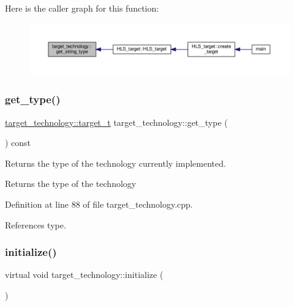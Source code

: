 Here is the caller graph for this function\+:
\nopagebreak
\begin{figure}[H]
\begin{center}
\leavevmode
\includegraphics[width=350pt]{d8/d05/classtarget__technology_a53355954503841a8ead7a8dc9889af85_icgraph}
\end{center}
\end{figure}
\mbox{\label{classtarget__technology_a4edc5ba729f24a445c0f5edb37d5f44b}} 
\subsubsection{\texorpdfstring{get\+\_\+type()}{get\_type()}}
{\footnotesize\ttfamily \hyperlink{classtarget__technology_a84257c2d384aa7dce6a060105113459b}{target\+\_\+technology\+::target\+\_\+t} target\+\_\+technology\+::get\+\_\+type (\begin{DoxyParamCaption}{ }\end{DoxyParamCaption}) const}



Returns the type of the technology currently implemented. 

\begin{DoxyReturn}{Returns}
the type of the technology 
\end{DoxyReturn}


Definition at line 88 of file target\+\_\+technology.\+cpp.



References type.

\mbox{\label{classtarget__technology_a1fc1fd2d6ccfa9e748f54a4aeac33b51}} 
\subsubsection{\texorpdfstring{initialize()}{initialize()}}
{\footnotesize\ttfamily virtual void target\+\_\+technology\+::initialize (\begin{DoxyParamCaption}{ }\end{DoxyParamCaption})\hspace{0.3cm}{\ttfamily [pure virtual]}}



